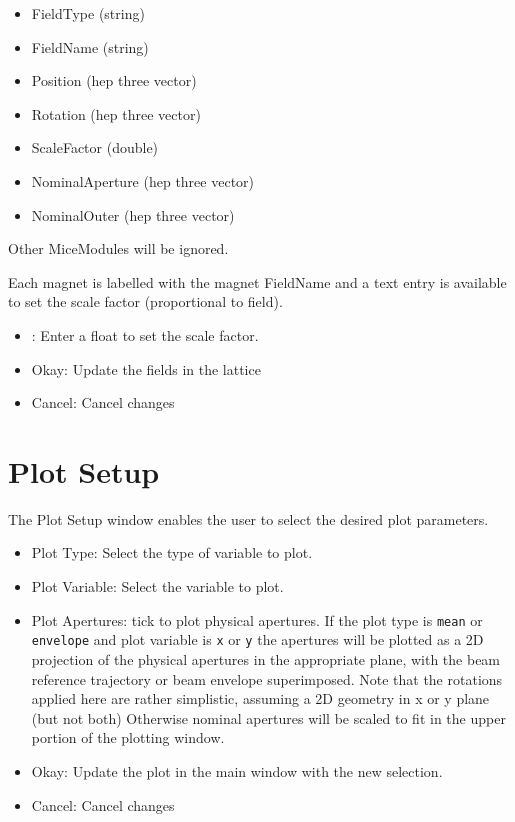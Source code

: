 \begin{itemize}
\item FieldType (string)
\item FieldName (string)
\item Position (hep three vector)
\item Rotation (hep three vector)
\item ScaleFactor (double)
\item NominalAperture (hep three vector)
\item NominalOuter (hep three vector)
\end{itemize}

Other MiceModules will be ignored.

Each magnet is labelled with the magnet FieldName and a text entry is available
to set the scale factor (proportional to field).

\begin{itemize}
\item <field entries>: Enter a float to set the scale factor.
\item Okay: Update the fields in the lattice
\item Cancel: Cancel changes
\end{itemize}

\section{Plot Setup}
The Plot Setup window enables the user to select the desired plot parameters.

\begin{itemize}
\item Plot Type: Select the type of variable to plot.
\item Plot Variable: Select the variable to plot.
\item Plot Apertures: tick to plot physical apertures. If the plot type is
\verb|mean| or \verb|envelope| and plot variable is \verb|x| or \verb|y| the 
apertures will be 
plotted as a 2D projection of the physical apertures in the appropriate plane,
with the beam reference trajectory or beam envelope superimposed. Note that the
rotations applied here are rather simplistic, assuming a 2D geometry in x or y
plane (but not both) Otherwise nominal apertures will be scaled to fit in the 
upper portion of the plotting window.
\item Okay: Update the plot in the main window with the new selection.
\item Cancel: Cancel changes
\end{itemize}


